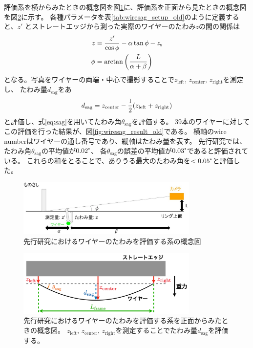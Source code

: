 \documentclass[../../main.tex]{subfiles}
\begin{document}
評価系を横からみたときの概念図を図\ref{fig:wiresag_setup_side_old}に、評価系を正面から見たときの概念図を図\ref{fig:wiresag_setup_front_old}に示す。
各種パラメータを表\ref{tab:wiresag_setup_old}のように定義すると、$z'$ とストレートエッジから測った実際のワイヤーのたわみ$z$の間の関係は
\begin{align}
    z &= \dfrac{z'}{\cos\phi} - \alpha\tan\phi - z_{\mathrm{s}} \\
    \phi &= \arctan\qty(\dfrac{L}{\alpha+\beta})
\end{align}
となる。写真をワイヤーの両端・中心で撮影することで$z_\mathrm{left},\,z_\mathrm{center},\,z_\mathrm{right}$を測定し、
たわみ量$d_{\mathrm{sag}}$をあ
\begin{equation}
    d_{\mathrm{sag}} =  z_{\mathrm{center}} - \dfrac{1}{2}\qty(z_{\mathrm{left}} + z_{\mathrm{right}})
\end{equation}
と評価し、式\eqref{eq:sag}を用いてたわみ角$\theta_{\mathrm{sag}}$を評価する。
39本のワイヤーに対してこの評価を行った結果が、図\ref{fig:wiresag_result_old}である。
横軸のwire numberはワイヤーの通し番号であり、縦軸はたわみ量を表す。
先行研究\cite{swg:murata}では、たわみ角$\theta_{\mathrm{sag}}$の平均値が$0.02\tcdegree$、
各$\theta_{\mathrm{sag}}$の誤差の平均値が$0.03\tcdegree$であると評価されている。
これらの和をとることで、ありうる最大のたわみ角を$<0.05\tcdegree$と評価した。
\begin{figure}[H]
    \centering
    \includegraphics[width=0.8\textwidth]{wiregrid/wiresag_setup_old.pdf}
    \caption{先行研究におけるワイヤーのたわみを評価する系の概念図\cite{swg:murata}}
    \label{fig:wiresag_setup_side_old}
\end{figure}
\begin{figure}[H]
    \centering
    \includegraphics[width=0.8\textwidth]{wiresag/wiresag_setup_front_old.pdf}
    \caption{先行研究におけるワイヤーのたわみを評価する系を正面からみたときの概念図。
    $z_\mathrm{left},\,z_\mathrm{center},\,z_\mathrm{right}$を測定することでたわみ量$d_{\mathrm{sag}}$を評価する。}
    \label{fig:wiresag_setup_front_old}
\end{figure}
\end{document}

